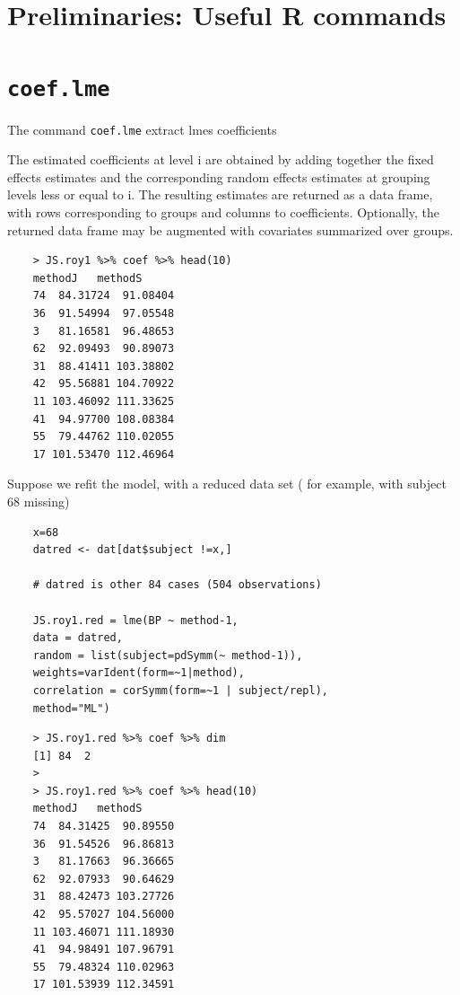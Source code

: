 \documentclass[Main.tex]{subfiles}
\begin{document}
\section{Preliminaries: Useful R commands}
\section{\texttt{coef.lme}}

The command \texttt{coef.lme} extract lmes coefficients


The estimated coefficients at level i are obtained by adding together the fixed effects estimates and the corresponding random effects estimates at grouping levels less or equal to i. The resulting estimates are returned as a data frame, with rows corresponding to groups and columns to coefficients. Optionally, the returned data frame may be augmented with covariates summarized over groups.
\begin{framed}
	\begin{verbatim}
	> JS.roy1 %>% coef %>% head(10)
	methodJ   methodS
	74  84.31724  91.08404
	36  91.54994  97.05548
	3   81.16581  96.48653
	62  92.09493  90.89073
	31  88.41411 103.38802
	42  95.56881 104.70922
	11 103.46092 111.33625
	41  94.97700 108.08384
	55  79.44762 110.02055
	17 101.53470 112.46964
	\end{verbatim}
\end{framed}
Suppose we refit the model, with a reduced data set ( for example, with subject 68 missing)

\begin{framed}
	\begin{verbatim}
	x=68
	datred <- dat[dat$subject !=x,]
	
	# datred is other 84 cases (504 observations)
	
	JS.roy1.red = lme(BP ~ method-1, 
	data = datred,
	random = list(subject=pdSymm(~ method-1)), 
	weights=varIdent(form=~1|method),
	correlation = corSymm(form=~1 | subject/repl), 
	method="ML")
	\end{verbatim}
\end{framed}

\begin{framed}
	\begin{verbatim}
	> JS.roy1.red %>% coef %>% dim
	[1] 84  2
	>
	> JS.roy1.red %>% coef %>% head(10)
	methodJ   methodS
	74  84.31425  90.89550
	36  91.54526  96.86813
	3   81.17663  96.36665
	62  92.07933  90.64629
	31  88.42473 103.27726
	42  95.57027 104.56000
	11 103.46071 111.18930
	41  94.98491 107.96791
	55  79.48324 110.02963
	17 101.53939 112.34591
	
	\end{verbatim}
\end{framed}
\end{document}
